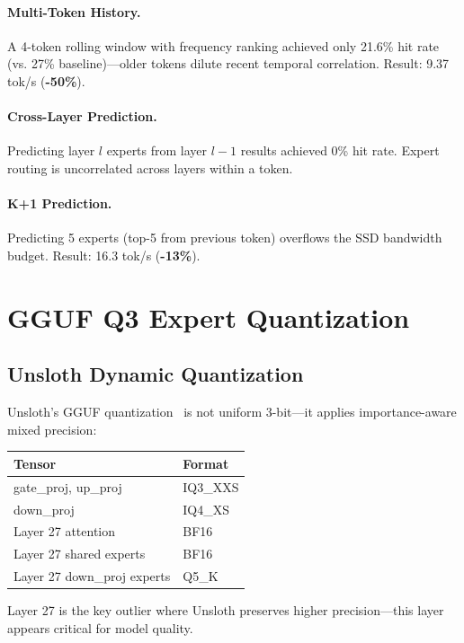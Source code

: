 \documentclass[11pt,twocolumn]{article}
\begin{document}
\paragraph{Multi-Token History.} A 4-token rolling window with frequency ranking achieved only 21.6\% hit rate (vs. 27\% baseline)---older tokens dilute recent temporal correlation. Result: 9.37 tok/s (\textbf{-50\%}).

\paragraph{Cross-Layer Prediction.} Predicting layer $l$ experts from layer $l-1$ results achieved 0\% hit rate. Expert routing is uncorrelated across layers within a token.

\paragraph{K+1 Prediction.} Predicting 5 experts (top-5 from previous token) overflows the SSD bandwidth budget. Result: 16.3 tok/s (\textbf{-13\%}).

\section{GGUF Q3 Expert Quantization}

\subsection{Unsloth Dynamic Quantization}

Unsloth's GGUF quantization~\cite{unsloth} is not uniform 3-bit---it applies importance-aware mixed precision:

\begin{center}
\begin{tabular}{ll}
\toprule
\textbf{Tensor} & \textbf{Format} \\
\midrule
gate\_proj, up\_proj & IQ3\_XXS \\
down\_proj & IQ4\_XS \\
Layer 27 attention & BF16 \\
Layer 27 shared experts & BF16 \\
Layer 27 down\_proj experts & Q5\_K \\
\bottomrule
\end{tabular}
\end{center}

Layer 27 is the key outlier where Unsloth preserves higher precision---this layer appears critical for model quality.
\end{document}
